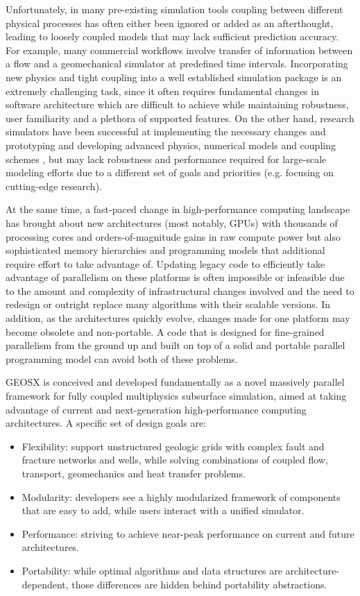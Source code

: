 Unfortunately, in many pre-existing simulation tools coupling between different physical processes has often either been ignored or added as an afterthought, leading to loosely coupled models that may lack sufficient prediction accuracy.   For example, many commercial workflows involve transfer of information between a flow and a geomechanical simulator at predefined time intervals.   Incorporating new physics and tight coupling into a well established simulation package is an extremely challenging task, since it often requires fundamental changes in software architecture which are difficult to achieve while maintaining robustness, user familiarity and a plethora of supported features.   On the other hand, research simulators have been successful at implementing the necessary changes and prototyping and developing advanced physics, numerical models and coupling schemes \cite{Rin2017,Garipov2018}, but may lack robustness and performance required for large-scale modeling efforts due to a different set of goals and priorities (e.g. focusing on cutting-edge research).

At the same time, a fast-paced change in high-performance computing landscape has brought about new architectures (most notably, GPUs) with thousands of processing cores and orders-of-magnitude gains in raw compute power but also sophisticated memory hierarchies and programming models that additional require effort to take advantage of.   Updating legacy code to efficiently take advantage of parallelism on these platforms is often impossible or infeasible due to the amount and complexity of infrastructural changes involved and the need to redesign or outright replace many algorithms with their scalable versions.   In addition, as the architectures quickly evolve, changes made for one platform may become obsolete and non-portable.   A code that is designed for fine-grained parallelism from the ground up and built on top of a solid and portable parallel programming model can avoid both of these problems.

GEOSX is conceived and developed fundamentally as a novel massively parallel framework for fully coupled multiphysics subsurface simulation, aimed at taking advantage of current and next-generation high-performance computing architectures.   A specific set of design goals are:
\begin{itemize}
    \item Flexibility: support unstructured geologic grids with complex fault and fracture networks and wells, while solving combinations of coupled flow, transport, geomechanics and heat transfer problems.
    \item Modularity: developers see a highly modularized framework of components that are easy to add, while users interact with a unified simulator.
    \item Performance: striving to achieve near-peak performance on current and future architectures.
    \item Portability: while optimal algorithms and data structures are architecture-dependent, those differences are hidden behind portability abstractions.
\end{itemize}

